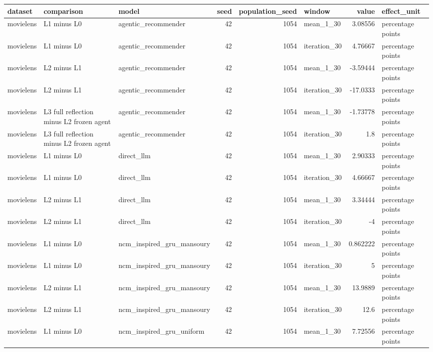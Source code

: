 \begin{table}[htbp!]
\centering
\small
\setlength{\tabcolsep}{3pt}
\renewcommand{\arraystretch}{1.1}
\begin{tabular}{lllrrlrl}
\hline
dataset & comparison & model & seed & population\_seed & window & value & effect\_unit \\
\hline
movielens & L1 minus L0 & agentic\_recommender & 42 & 1054 & mean\_1\_30 & 3.08556 & percentage points \\
movielens & L1 minus L0 & agentic\_recommender & 42 & 1054 & iteration\_30 & 4.76667 & percentage points \\
movielens & L2 minus L1 & agentic\_recommender & 42 & 1054 & mean\_1\_30 & -3.59444 & percentage points \\
movielens & L2 minus L1 & agentic\_recommender & 42 & 1054 & iteration\_30 & -17.0333 & percentage points \\
movielens & L3 full reflection minus L2 frozen agent & agentic\_recommender & 42 & 1054 & mean\_1\_30 & -1.73778 & percentage points \\
movielens & L3 full reflection minus L2 frozen agent & agentic\_recommender & 42 & 1054 & iteration\_30 & 1.8 & percentage points \\
movielens & L1 minus L0 & direct\_llm & 42 & 1054 & mean\_1\_30 & 2.90333 & percentage points \\
movielens & L1 minus L0 & direct\_llm & 42 & 1054 & iteration\_30 & 4.66667 & percentage points \\
movielens & L2 minus L1 & direct\_llm & 42 & 1054 & mean\_1\_30 & 3.34444 & percentage points \\
movielens & L2 minus L1 & direct\_llm & 42 & 1054 & iteration\_30 & -4 & percentage points \\
movielens & L1 minus L0 & ncm\_inspired\_gru\_mansoury & 42 & 1054 & mean\_1\_30 & 0.862222 & percentage points \\
movielens & L1 minus L0 & ncm\_inspired\_gru\_mansoury & 42 & 1054 & iteration\_30 & 5 & percentage points \\
movielens & L2 minus L1 & ncm\_inspired\_gru\_mansoury & 42 & 1054 & mean\_1\_30 & 13.9889 & percentage points \\
movielens & L2 minus L1 & ncm\_inspired\_gru\_mansoury & 42 & 1054 & iteration\_30 & 12.6 & percentage points \\
movielens & L1 minus L0 & ncm\_inspired\_gru\_uniform & 42 & 1054 & mean\_1\_30 & 7.72556 & percentage points \\

\end{tabular}
\end{table}
